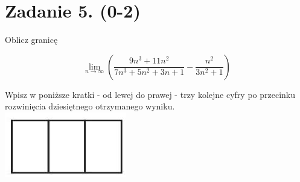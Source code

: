 \documentclass[10pt]{article}
\begin{document}
\section*{Zadanie 5. (0-2)}
Oblicz granicę

\[
\lim _{n \rightarrow \infty}\left(\frac{9 n^{3}+11 n^{2}}{7 n^{3}+5 n^{2}+3 n+1}-\frac{n^{2}}{3 n^{2}+1}\right)
\]

Wpisz w poniższe kratki - od lewej do prawej - trzy kolejne cyfry po przecinku rozwinięcia dziesiętnego otrzymanego wyniku.\\
\includegraphics[max width=\textwidth, center]{2024_11_21_9df891ea1c7ef9791261g-04}
\end{document}
